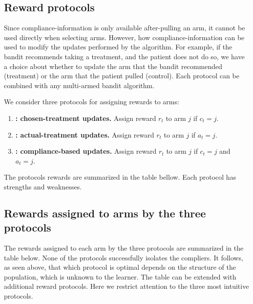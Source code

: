 \subsection{Reward protocols}
\label{sec:protocols}

Since compliance-information is only available after-pulling an arm, it cannot be used directly when selecting arms. However, how compliance-information can be used to modify the updates performed by the algorithm. For example, if the bandit recommends taking a treatment, and the patient does not do so, we have a choice about whether to update the arm that the bandit recommended (treatment) or the arm that the patient pulled (control).
Each protocol can be combined with any multi-armed bandit algorithm. 

\begin{defn}\label{def:protocols}\eod
	We consider three protocols for assigning rewards to arms:
	\begin{enumerate}[P1.]
		\item \textbf{\chosen: chosen-treatment updates.}
		Assign reward $r_t$ to arm $j$ if $c_t=j$.
		\item \textbf{\actual: actual-treatment updates.}
		Assign reward $r_t$ to arm $j$ if $a_t=j$.
		\item \textbf{\comply: compliance-based updates.}
		Assign reward $r_t$ to arm $j$ if $c_t=j$ and $a_t=j$.
	\end{enumerate}
\end{defn}
The protocols rewards are summarized in the table bellow. Each protocol has strengths and weaknesses.

\subsection{Rewards assigned to arms by the three protocols}
\label{sec:protocol_table}

The rewards assigned to each arm by the three protocols are summarized in the table below. None of the protocols successfully isolates the compliers. It follows, as seen above, that which protocol is optimal depends on the structure of the population, which is unknown to the learner. The table can be extended with additional reward protocols. Here we restrict attention to the three most intuitive protocols.


